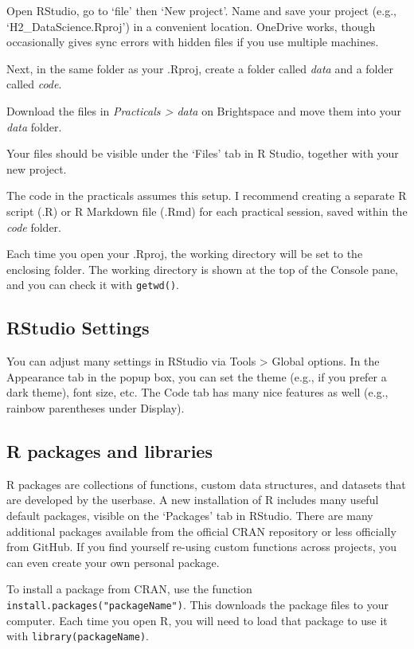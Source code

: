 \documentclass[
  11pt,
  a4paper,
]{book}
\begin{document}
Open RStudio, go to `file' then `New project'. Name and save your project (e.g., `H2\_DataScience.Rproj') in a convenient location. OneDrive works, though occasionally gives sync errors with hidden files if you use multiple machines.

Next, in the same folder as your .Rproj, create a folder called \emph{data} and a folder called \emph{code}.

Download the files in \emph{Practicals \textgreater{} data} on Brightspace and move them into your \emph{data} folder.

Your files should be visible under the `Files' tab in R Studio, together with your new project.

The code in the practicals assumes this setup. I recommend creating a separate R script (.R) or R Markdown file (.Rmd) for each practical session, saved within the \emph{code} folder.

Each time you open your .Rproj, the working directory will be set to the enclosing folder. The working directory is shown at the top of the Console pane, and you can check it with \texttt{getwd()}.

\hypertarget{rstudio-settings}{%
\subsection{RStudio Settings}\label{rstudio-settings}}

You can adjust many settings in RStudio via Tools \textgreater{} Global options. In the Appearance tab in the popup box, you can set the theme (e.g., if you prefer a dark theme), font size, etc. The Code tab has many nice features as well (e.g., rainbow parentheses under Display).

\hypertarget{r-packages-and-libraries}{%
\subsection{R packages and libraries}\label{r-packages-and-libraries}}

R packages are collections of functions, custom data structures, and datasets that are developed by the userbase. A new installation of R includes many useful default packages, visible on the `Packages' tab in RStudio. There are many additional packages available from the official CRAN repository or less officially from GitHub. If you find yourself re-using custom functions across projects, you can even create your own personal package.

To install a package from CRAN, use the function \texttt{install.packages("packageName")}. This downloads the package files to your computer. Each time you open R, you will need to load that package to use it with \texttt{library(packageName)}.
\end{document}
